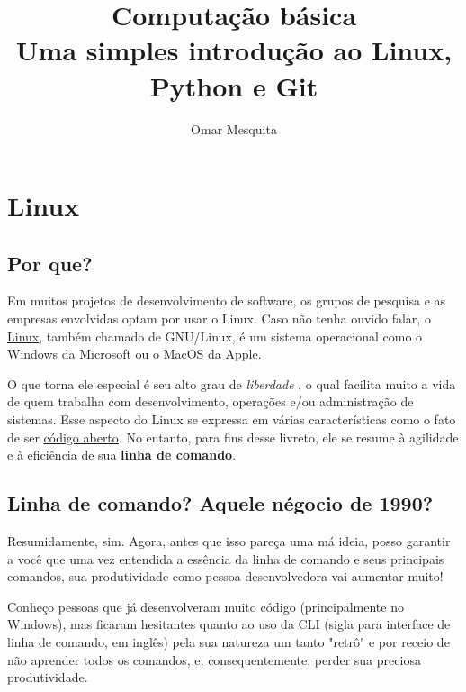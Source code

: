\documentclass{article}
\begin{document}
	\title {Computação básica \\[1ex] \large Uma simples introdução ao Linux, Python e Git}
	\date{}
	\author{Omar Mesquita}
	\maketitle
	\thispagestyle{empty}
	
	\newpage
	\tableofcontents

	\newpage
	\section{Linux}
	\subsection{Por que?}
	
	Em muitos projetos de desenvolvimento de software, os grupos de pesquisa e as empresas envolvidas optam por  
	usar o Linux. Caso não tenha ouvido falar, o \href{https://pt.wikipedia.org/wiki/Linux}{Linux}, também chamado de GNU/Linux, é um sistema operacional como o 
	Windows da Microsoft ou o MacOS da Apple. 


	O que torna ele especial é seu alto grau de \textit{liberdade} , o qual facilita muito a vida de quem trabalha com 
	desenvolvimento, operações e/ou administração de sistemas. Esse aspecto do Linux se expressa em várias características 
	como o fato de ser \href{https://pt.wikipedia.org/wiki/C%C3%B3digo_aberto}{código aberto}. No entanto, para fins desse livreto, ele se resume à agilidade
	e à eficiência de sua \textbf{linha de comando}.

	\subsection{Linha de comando? Aquele négocio de 1990?} 

	Resumidamente, sim. Agora, antes que isso pareça uma má ideia, posso garantir a você que uma vez entendida a essência da
	linha de comando e seus principais comandos, sua produtividade como pessoa desenvolvedora vai aumentar muito! 

	Conheço pessoas que já desenvolveram muito código (principalmente no Windows), 
	mas ficaram hesitantes quanto ao uso da CLI (sigla para interface de linha de comando, em inglês) 
	pela sua natureza um tanto "retrô" e por receio de não aprender todos os comandos, e,
	consequentemente, perder sua preciosa produtividade. 
\end{document}
